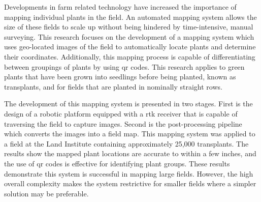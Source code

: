 
\pagestyle{empty}
\setlength{\baselineskip}{0.8cm}




Developments in farm related technology have increased the importance of mapping individual plants in the field.  An automated mapping system allows the size of these fields to scale up without being hindered by time-intensive, manual surveying.  This research focuses on the development of a mapping system which uses geo-located images of the field to automatically locate plants and determine their coordinates.  Additionally, this mapping process is capable of differentiating between groupings of plants by using \ac{qr} codes.  This research applies to green plants that have been grown into seedlings before being planted, known as transplants, and for fields that are planted in nominally straight rows. 

The development of this mapping system is presented in two stages.  First is the design of a robotic platform equipped with a \ac{rtk} receiver that is capable of traversing the field to capture images. Second is the post-processing pipeline which converts the images into a field map.  This mapping system was applied to a field at the Land Institute containing approximately 25,000 transplants. The results show the mapped plant locations are accurate to within a few inches, and the use of \ac{qr} codes is effective for identifying plant groups.  These results demonstrate this system is successful in mapping large fields.  However, the high overall complexity makes the system restrictive for smaller fields where a simpler solution may be preferable. 
